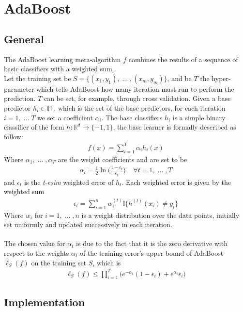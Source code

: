 
\chapter{AdaBoost}
\section{General}
	The AdaBoost learning meta-algorithm $f$ combines the results of a sequence of basic classifiers with a weighted sum. \\
	Let the training set be $S=\lbrace (x_{1}, y_{1}),\; \dots\;, (x_{m}, y_{m}) \rbrace$, and be $T$ the hyper-parameter which tells AdaBoost how many iteration must run to perform the prediction. $T$ can be set, for example, through cross validation. Given a base predictor $h_{i} \in \mathbb{H}\;$, which is the set of the base predictors, for each iteration $i = 1,\;\dots\;T$ we set a coefficient $\alpha_{i}$. The base classifiers $h_{i}$ is a simple binary classifier of the form $h:\mathbb{R}^{d}\to\lbrace-1, 1\rbrace$, the base learner is formally described as follow:
	\begin{align*}
		f(x) = \sum_{i=1}^{T}\alpha_{i}h_{i}(x)
	\end{align*}
	Where $\alpha_{1},\;\dots\;,\alpha_{T}$ are the weight coefficients and are set to be
	\begin{align*}
		\alpha_{t} = \frac{1}{2}\ln \Big( \frac{1-\epsilon_{t}}{\epsilon_{t}} \Big) \;\;\;\; \forall t=1,\;\dots\;,T
	\end{align*}
	and $\epsilon_{t}$ is the \textit{t-esim} weighted error of $h_{t}$. Each weighted error is given by the weighted sum
	\begin{align*}
		\epsilon_{t} = \sum_{i=1}^{n} w_{i}^{(t)}\mathbb{I}\big\lbrace h^{(t)}(x_{i}) \neq y_{i} \big\rbrace
	\end{align*}
	Where $w_{i}$ for $i = 1,\;\dots\;, n$ is a weight distribution over the data points, initially set uniformly and updated successively in each iteration.\\\\
	The chosen value for $\alpha_{t}$ is due to the fact that it is the zero derivative with respect to the weights $\alpha_{t}$ of the training error's upper bound of AdaBoost $\hat{\ell}_{S}(f)$ on the training set $S$, which is
	\begin{align*}
		\hat{\ell}_{S}(f) \leq \prod_{i=1}^{T}\big( e^{-\alpha_{i}}(1-\epsilon_{i}) + e^{\alpha_{i}}\epsilon_{i} \big)
	\end{align*}
	
	
\section{Implementation}